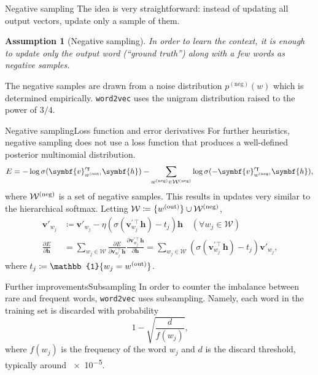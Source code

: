 \documentclass[serif, xcolor={svgnames, table}, usepdftitle=false]{beamer}
\renewcommand*{\vec}{\symbf}
\newtheorem{assumption}{Assumption}
\begin{document}
\begin{frame}{Negative sampling}
  The idea is very straightforward: instead of updating all output vectors,
  update only a sample of them.

  \begin{assumption}[Negative sampling]
    In order to learn the context, it is enough to update only the output word
    (``ground truth'') along with a few words as negative samples.
  \end{assumption}

  The negative samples are drawn from a noise distribution
  \(p^{\mathrm{(neg)}}(w)\) which is determined empirically.  \texttt{word2vec}
  uses the unigram distribution raised to the power of \(3 / {4}\).
\end{frame}

\begin{frame}{Negative sampling}{Loss function and error derivatives}
  For further heuristics, negative sampling does not use a loss function that
  produces a well-defined posterior multinomial distribution.
  \[
    E = -\log \sigma(\vec{v}^{\prime\intercal}_{\wo} \vec{h}) - \sum_{\wn \in
      \Wn} \log \sigma(-\vec{v}^{\prime\intercal}_{\wn} \vec{h})\text{,}
  \]
  where \(\mathcal{W}^{\mathrm{(neg)}}\) is a set of negative samples.  This results in updates very
  similar to the hierarchical softmax.  Letting
  \(\mathcal{W} \coloneqq \{w^{\mathrm{(out)}}\} \cup \mathcal{W}^{\mathrm{(neg)}}\),
  \begin{align*}
    \vec{v}'_{w_j} &\coloneqq \vec{v}'_{w_j} - \eta \left(\sigma(\vec{v}^{\prime\intercal}_{w_j} \vec{h})
                     - t_j\right) \vec{h} \quad (\forall w_j \in \mathcal{W}) \\
    \frac{\partial E}{\partial \vec{h}}
                   &=
                     \sum\limits_{w_j \in \mathcal{W}} \frac{\partial E}{\partial
                     \vec{v}^{\prime\intercal}_{w_j} \vec{h}} \frac{\partial
                     \vec{v}^{\prime\intercal}_{w_j} \vec{h}}{\partial \vec{h}}
                   = \sum\limits_{w_j \in \mathcal{W}}
                     \left(\sigma(\vec{v}^{\prime\intercal}_{w_j} \vec{h}) - t_j\right) \vec{v}'_{w_j}\text{,}
  \end{align*}
  where \(t_j \coloneqq \mathbb{1}\{w_j = \wo\}\).
\end{frame}

\begin{frame}{Further improvements}{Subsampling}
  In order to counter the imbalance between rare and frequent words,
  \texttt{word2vec} uses subsampling.  Namely, each word in the training set is
  discarded with probability
  \[
    1 - \sqrt{\frac{d}{f(w_j)}}\text{,}
  \]
  where \(f(w_j)\) is the frequency of the word \(w_j\) and \(d\) is the discard
  threshold, typically around \num{e-5}.
\end{frame}
\end{document}
